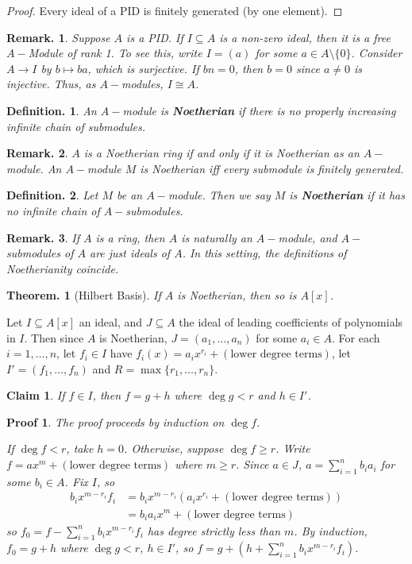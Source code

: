 \documentclass[11pt, a4paper]{memoir}
\theoremstyle{change}
\newtheorem{theorem}{Theorem.}[section]
\theoremstyle{plain}
\newtheorem{claim}{Claim}
\theoremstyle{nonumberplain}
\newtheorem{definition}{Definition.}
\newtheorem{remark}{Remark.}
\newtheorem{proof}{Proof}
\newtheorem{nmproof}{Proof}
\numberwithin{equation}{section}
\begin{document}
\begin{proof}
    Every ideal of a PID is finitely generated (by one element).
\end{proof}
\begin{remark}
    Suppose $A$ is a PID.
    If $I\subseteq A$ is a non-zero ideal, then it is a free $A-$Module of rank 1.
    To see this, write $I=(a)$ for some $a\in A\setminus\{0\}$.
    Consider $A\to I$ by $b\mapsto ba$, which is surjective.
    If $bn=0$, then $b=0$ since $a\neq 0$ is injective.
    Thus, as $A-$modules, $I\cong A$.
\end{remark}
\begin{definition}
    An $A-$module is \textbf{Noetherian} if there is no properly increasing infinite chain of submodules.
\end{definition}
\begin{remark}
    $A$ is a Noetherian ring if and only if it is Noetherian as an $A-$module.
    An $A-$module $M$ is Noetherian iff every submodule is finitely generated.
\end{remark}
\begin{definition}
    Let $M$ be an $A-$module.
    Then we say $M$ is \textbf{Noetherian} if it has no infinite chain of $A-$submodules.
\end{definition}
\begin{remark}
    If $A$ is a ring, then $A$ is naturally an $A-$module, and $A-$submodules of $A$ are just ideals of $A$.
    In this setting, the definitions of Noetherianity coincide.
\end{remark}
\begin{theorem}[Hilbert Basis]
    If $A$ is Noetherian, then so is $A[x]$.
\end{theorem}
Let $I\subseteq A[x]$ an ideal, and $J\subseteq A$ the ideal of leading coefficients of polynomials in $I$.
Then since $A$ is Noetherian, $J=(a_1,\ldots,a_n)$ for some $a_i\in A$.
For each $i=1,\ldots,n$, let $f_i\in I$ have $f_i(x)=a_ix^{r_i}+(\text{lower degree terms})$, let $I'=(f_1,\ldots,f_n)$ and $R=\max\{r_1,\ldots,r_n\}$.
\begin{claim}\label{cl:hil-1}
    If $f\in I$, then $f=g+h$ where $\deg g<r$ and $h\in I'$.
\end{claim}
\begin{nmproof}
    The proof proceeds by induction on $\deg f$.

    If $\deg f<r$, take $h=0$.
    Otherwise, suppose $\deg f\geq r$.
    Write $f=ax^m+(\text{lower degree terms})$ where $m\geq r$.
    Since $a\in J$, $a=\sum_{i=1}^n b_ia_i$ for some $b_i\in A$.
    Fix $I$, so
    \begin{align*}
        b_ix^{m-r_i}f_i &= b_ix^{m-r_i}(a_ix^{r_i}+(\text{lower degree terms}))\\
                        &= b_ia_ix^m+(\text{lower degree terms})
    \end{align*}
    so $f_0=f-\sum_{i=1}^n b_ix^{m-r_i}f_i$ has degree strictly less than $m$.
    By induction, $f_0=g+h$ where $\deg g<r$, $h\in I'$, so $f=g+\left(h+\sum_{i=1}^n b_ix^{m-r_i}f_i\right)$.
\end{nmproof}
\end{document}
